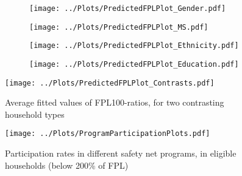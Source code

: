 \begin{figure}[H]
\centering
\caption{Average estimates of FPL100-ratios, for households with a working age adult with disability (a) by gender (b) by marital status (c) by race and ethnicity (d) by education, of reference person}
\begin{subfigure}{0.49\linewidth}
\texttt{[image: ../Plots/PredictedFPLPlot\_Gender.pdf]}
\caption{}
\label{fig:disab_gender}
\end{subfigure}
\begin{subfigure}{0.49\linewidth}
\texttt{[image: ../Plots/PredictedFPLPlot\_MS.pdf]} 
\caption{}
\label{fig:disab_MS} 
\end{subfigure}
\newline
\begin{subfigure}{0.49\linewidth}
\texttt{[image: ../Plots/PredictedFPLPlot\_Ethnicity.pdf]}
\caption{}
\label{fig:disab_race}
\end{subfigure}
\begin{subfigure}{0.49\linewidth}
\texttt{[image: ../Plots/PredictedFPLPlot\_Education.pdf]}
\caption{}
\label{fig:disab_education}
\end{subfigure}
\label{fig:Disab_Demographics}
\end{figure}

\begin{figure}[H]
\caption{Average fitted values of FPL100-ratios, for two contrasting household types}
\centering
\texttt{[image: ../Plots/PredictedFPLPlot\_Contrasts.pdf]}
\label{fig:contrasts}
\end{figure}

\begin{figure}[H]
\caption{Participation rates in different safety net programs, in eligible households (below 200\% of FPL)}
\centering
\texttt{[image: ../Plots/ProgramParticipationPlots.pdf]}
\label{fig:programParticipation}
\end{figure}

